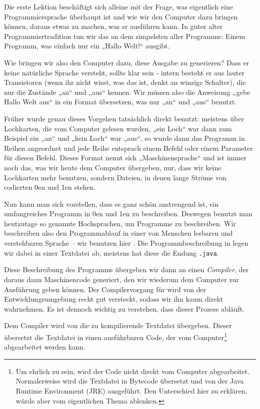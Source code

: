 
Die erste Lektion beschäftigt sich alleine mit der Frage, was eigentlich eine
Programmiersprache überhaupt ist und wie wir den Computer dazu bringen können,
daraus etwas zu machen, was er ausführen kann. In guter alter
Programmiertradition tun wir das an dem simpelsten aller Programme: Einem
Programm, was einfach nur ein „Hallo Welt!“ ausgibt.

Wie bringen wir also den Computer dazu, diese Ausgabe zu generieren? Dass er
keine natürliche Sprache versteht, sollte klar sein - intern besteht er aus
lauter Transistoren (wenn ihr nicht wisst, was das ist, denkt an winzige
Schalter), die nur die Zustände „an“ und „aus“ kennen. Wir müssen also die
Anweisung „gebe Hallo Welt aus“ in ein Format übersetzen, was nur „an“ und „aus“
benutzt.

Früher wurde genau dieses Vorgehen tatsächlich direkt benutzt: meistens über
Lochkarten, die vom Computer gelesen wurden, „ein Loch“ war dann zum Beispiel
ein „an“ und „kein Loch“ war „aus“, so wurde dann das Programm in Reihen
angeordnet und jede Reihe entsprach einem Befehl oder einem Parameter für diesen
Befehl. Dieses Format nennt sich „Maschinensprache“ und ist immer noch das, was
wir heute dem Computer übergeben, nur, dass wir keine Lochkarten mehr benutzen,
sondern Dateien, in denen lange Ströme von codierten 0en und 1en stehen.

Nun kann man sich vorstellen, dass es ganz schön anstrengend ist, ein
umfangreiches Programm in 0en und 1en zu beschreiben. Deswegen benutzt man
heutzutage so genannte Hochsprachen, um Programme zu beschreiben. Wir
beschreiben also den Programmablauf in einer von Menschen lesbaren und
verstehbaren Sprache -- wir benutzen hier \Java. Die Programmbeschreibung in
\Java legen wir dabei in einer Textdatei ab, meistens hat diese die Endung
\texttt{.java}.

Diese Beschreibung des Programms übergeben wir dann an einen \emph{Compiler},
der daraus dann Maschinencode generiert, den wir wiederum dem Computer zur
Ausführung geben können. Der Compilervorgang für \Java wird von der
Entwicklungsumgebung \Eclipse recht gut versteckt, sodass wir ihn kaum direkt
wahrnehmen. Es ist dennoch wichtig zu verstehen, dass dieser Prozess abläuft.

Dem Compiler wird von \Eclipse die zu kompilierende Textdatei übergeben. Dieser
übersetzt die Textdatei in einen ausführbaren Code, der vom Computer\footnote{Um
ehrlich zu sein, wird der Code nicht direkt vom Computer abgearbeitet.
Normalerweise wird die Textdatei in Bytecode übersetzt und von der Java Runtime
Environment (JRE) ausgeführt. Den Unterschied hier zu erklären, würde aber vom
eigentlichen Thema ablenken.} abgearbeitet werden kann.

